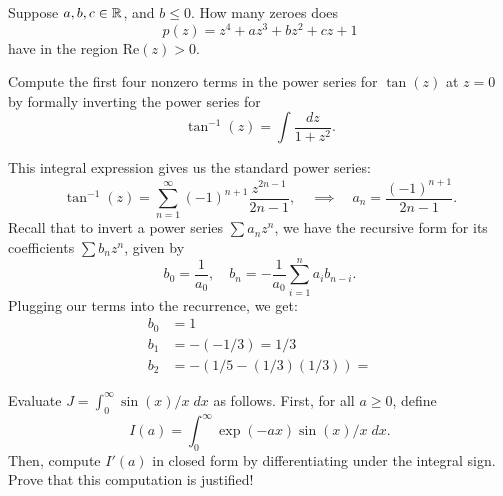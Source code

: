 \documentclass{pset}
\begin{document}
\begin{problem}{28}
  Suppose $a, b, c\in \mathbb{R}$, and $b\leq 0$. How many zeroes does
  \[
    p(z) = z^4 + az^3 + bz^2 + cz + 1
  \]
  have in the region $\textrm{Re}(z) >0$.
\end{problem}

\begin{problem}{32}
  Compute the first four nonzero terms in the power series for $\tan(z)$ at $z=0$ by formally inverting the power series for 
  \[
    \tan^{-1}(z) = \int \frac{dz}{1+z^2}.
  \]
\end{problem}

\begin{solution}
  This integral expression gives us the standard power series:
  \[\tan^{-1}(z) = \sum^\infty_{n=1} (-1)^{n+1}\frac{z^{2n-1}}{2n-1},\quad \implies \quad a_n = \frac{(-1)^{n+1}}{2n-1}.\]
  Recall that to invert a power series $\sum a_nz^n$, we have the recursive form for its coefficients $\sum b_nz^n$, given by
  \[b_0 = \frac{1}{a_0}, \quad b_n = -\frac{1}{a_0}\sum^n_{i=1}a_ib_{n-i}.\]
  Plugging our terms into the recurrence, we get:
  \[\begin{aligned}
    b_0 &= 1\\
    b_1 &= -(-1/3) = 1/3\\
    b_2 &= -(1/5 -(1/3)(1/3)) = 
  \end{aligned}\]
\end{solution}

\begin{problem}{34}
  Evaluate $J=\int_0^\infty \sin(x) / x\;dx$ as follows. First, for all $a\geq 0$, define
  \[
    I(a) = \int^\infty_{0}\exp(-ax)\sin(x) /x\;dx.
  \]
  Then, compute $I'(a)$ in closed form by differentiating under the integral sign. Prove that this computation is justified!
\end{problem}
\end{document}
